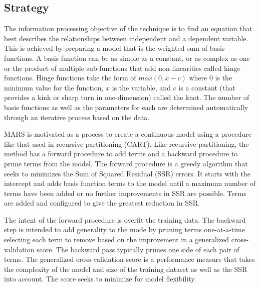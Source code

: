 \subsection{Strategy}
The information processing objective of the technique is to find an equation that best describes the relationships between independent and a dependent variable.
This is achieved by preparing a model that is the weighted sum of basis functions. A basis function can be as simple as a constant, or as complex as one or the product of multiple sub-functions that add non-linearities called hinge functions. Hinge functions take the form of $max(0, x-c)$ where $0$ is the minimum value for the function, $x$ is the variable, and $c$ is a constant (that provides a kink or sharp turn in one-dimension) called the knot. The number of basis functions as well as the parameters for each are determined automatically through an iterative process based on the data.

MARS is motivated as a process to create a continuous model using a procedure like that used in recursive partitioning (CART). Like recursive partitioning, the method has a forward procedure to add terms and a backward procedure to prune terms from the model.
The forward procedure is a greedy algorithm that seeks to minimizes the Sum of Squared Residual (SSR) errors. It starts with the intercept and adds basis function terms to the model until a maximum number of terms have been added or no further improvements in SSR are possible. Terms are added and configured to give the greatest reduction in SSR.

The intent of the forward procedure is overfit the training data. The backward step is intended to add generality to the mode by pruning terms one-at-a-time selecting each term to remove based on the improvement in a generalized cross-validation score. The backward pass typically prunes one side of each pair of terms.
The generalized cross-validation score is a performance measure that takes the complexity of the model and size of the training dataset as well as the SSR into account. The score seeks to minimize for model flexibility.

